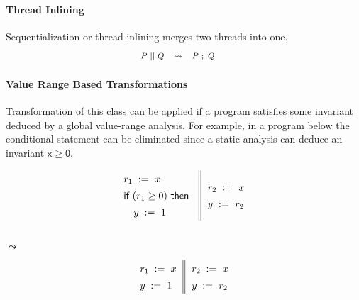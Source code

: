 \paragraph{Thread Inlining}

Sequentialization or thread inlining 
merges two threads into one. 
%
\[\def\arraystretch{1.4}\footnotesize
  \begin{array}{cccl} 

      P \pll Q 
    & \leadsto 
    & P ~\seq Q
    & ~ \\ 
    
  \end{array}
\]


\paragraph{Value Range Based Transformations}

Transformation of this class can be applied 
if a program satisfies some invariant deduced 
by a global value-range analysis. 
For example, in a program below   
the conditional statement can be eliminated 
since a static analysis can deduce an invariant 
$\mathsf{x} \geq \mathsf{0}$.

{\footnotesize
\begin{minipage}{0.45\linewidth}
\begin{equation*}
\inarrII{
   \readInst{}{r_1}{x}             \\
   \kw{if} (r_1 \geq 0) ~\kw{then} \\
   \quad\writeInst{}{y}{1}         \\
}{
  \readInst{}{r_2}{x}               \\
  \writeInst{}{y}{r_2}              \\
}
\end{equation*}
\end{minipage}\hfill%
\begin{minipage}{0.05\linewidth}
\Large~\\ $\leadsto$
\end{minipage}\hfill%
\begin{minipage}{0.4\linewidth}
\begin{equation*}
\inarrII{
   \readInst{}{r_1}{x}             \\
   \writeInst{}{y}{1}              \\
}{
  \readInst{}{r_2}{x}               \\
  \writeInst{}{y}{r_2}              \\
}
\end{equation*}
\end{minipage}
}

